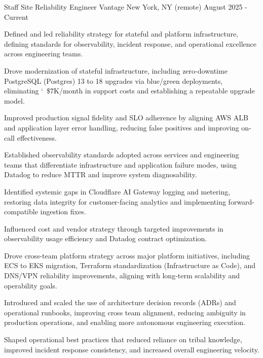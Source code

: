 

\begin{cventries}

  \cventry
  {Staff Site Reliability Engineer} %
  {Vantage} %
  {New York, NY (remote)} %
  {August 2025 - Current} %
  { 
    \begin{cvitems} %
      \item{Defined and led reliability strategy for stateful and platform infrastructure, defining standards for observability, incident response, and operational excellence across engineering teams.}
      \item{Drove modernization of stateful infrastructure, including zero-downtime PostgreSQL (Postgres) 13 to 18 upgrades via blue/green deployments, eliminating \char`~\$7K/month in support costs and establishing a repeatable upgrade model.}
      \item{Improved production signal fidelity and SLO adherence by aligning AWS ALB and application layer error handling, reducing false positives and improving on-call effectiveness.}
      \item{Established observability standards adopted across services and engineering teams that differentiate infrastructure and application failure modes, using Datadog to reduce MTTR and improve system diagnosability.}
      \item{Identified systemic gaps in Cloudflare AI Gateway logging and metering, restoring data integrity for customer-facing analytics and implementing forward-compatible ingestion fixes.}
      \item{Influenced cost and vendor strategy through targeted improvements in observability usage efficiency and Datadog contract optimization.}
      \item{Drove cross-team platform strategy across major platform initiatives, including ECS to EKS migration, Terraform standardization (Infrastructure as Code), and DNS/VPN reliability improvements, aligning with long-term scalability and operability goals.}
      \item{Introduced and scaled the use of architecture decision records (ADRs) and operational runbooks, improving cross team alignment, reducing ambiguity in production operations, and enabling more autonomous engineering execution.}
      \item{Shaped operational best practices that reduced reliance on tribal knowledge, improved incident response consistency, and increased overall engineering velocity.}
    \end{cvitems}
  }


\end{cventries}
